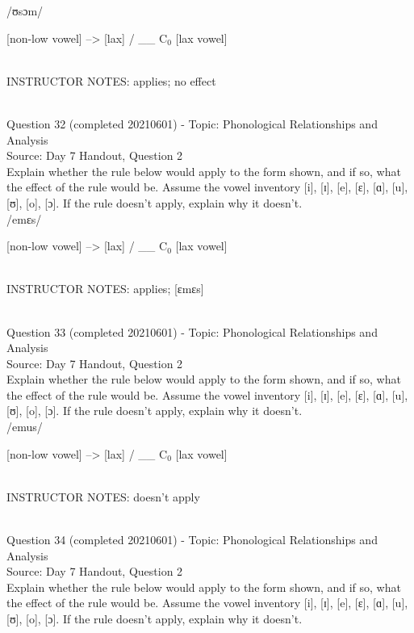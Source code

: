 \documentclass[12pt]{article}
\begin{document}
/ʊsɔm/

{[non-low vowel]} --> {[lax]} / __ C$_0$ {[lax vowel]}


~\\
INSTRUCTOR NOTES: applies; no effect


~\\

{\large Question 32} (completed 20210601) - Topic: Phonological Relationships and Analysis\\
Source: Day 7 Handout, Question 2\\

Explain whether the rule below would apply to the form shown, and if so, what the effect of the rule would be. Assume the vowel inventory [i], [ɪ], [e], [ɛ], [ɑ], [u], [ʊ], [o], [ɔ]. If the rule doesn't apply, explain why it doesn't.\\

/emɛs/

{[non-low vowel]} --> {[lax]} / __ C$_0$ {[lax vowel]}


~\\
INSTRUCTOR NOTES: applies; [ɛmɛs]


~\\

{\large Question 33} (completed 20210601) - Topic: Phonological Relationships and Analysis\\
Source: Day 7 Handout, Question 2\\

Explain whether the rule below would apply to the form shown, and if so, what the effect of the rule would be. Assume the vowel inventory [i], [ɪ], [e], [ɛ], [ɑ], [u], [ʊ], [o], [ɔ]. If the rule doesn't apply, explain why it doesn't.\\

/emus/

{[non-low vowel]} --> {[lax]} / __ C$_0$ {[lax vowel]}


~\\
INSTRUCTOR NOTES: doesn't apply


~\\

{\large Question 34} (completed 20210601) - Topic: Phonological Relationships and Analysis\\
Source: Day 7 Handout, Question 2\\

Explain whether the rule below would apply to the form shown, and if so, what the effect of the rule would be. Assume the vowel inventory [i], [ɪ], [e], [ɛ], [ɑ], [u], [ʊ], [o], [ɔ]. If the rule doesn't apply, explain why it doesn't.\\
\end{document}
